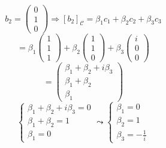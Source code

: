 \documentclass[a4paper]{article}
\theoremstyle{break}
\theoremstyle{break}
\theoremstyle{break}
\theoremstyle{break}
\begin{document}
\begin{enumerate}
	      \vspace{1em}
	      \[
		      b_2 = \begin{pmatrix} 0 \\ 1 \\ 0 \end{pmatrix}
		      \Rightarrow
		      [b_2]_{\mathcal{C}} = \beta_1 c_1 + \beta_2 c_2 + \beta_3 c_3
	      \]
	      \[
		      = \beta_1 \begin{pmatrix} 1 \\ 1 \\ 1 \end{pmatrix}
		      + \beta_2 \begin{pmatrix} 1 \\ 1 \\ 0 \end{pmatrix}
		      + \beta_3 \begin{pmatrix} i \\ 0 \\ 0 \end{pmatrix}
	      \]
	      \[
		      = \begin{pmatrix}
			      \beta_1 + \beta_2 + i\beta_3 \\
			      \beta_1 + \beta_2            \\
			      \beta_1
		      \end{pmatrix}
	      \]
	      \[
		      \begin{cases}
			      \beta_1 + \beta_2 + i\beta_3 = 0 \\
			      \beta_1 + \beta_2 = 1            \\
			      \beta_1 = 0
		      \end{cases}
		      \leadsto
		      \begin{cases}
			      \beta_1 = 0 \\
			      \beta_2 = 1 \\
			      \beta_3 = -\frac{1}{i}
		      \end{cases}
	      \]


\end{enumerate}
\end{document}
